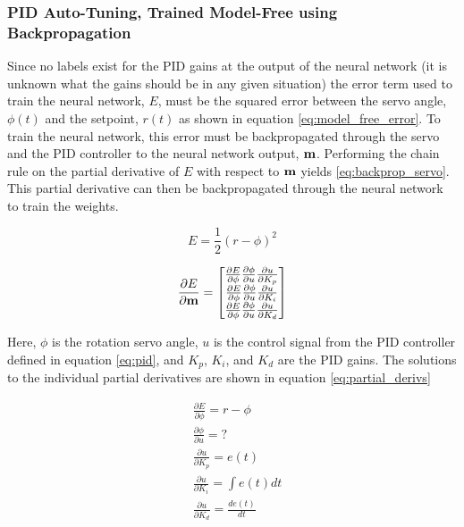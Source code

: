 \documentclass[letterpaper,12pt]{article}
\newcommand{\di}{\partial}
\begin{document}
\subsubsection{PID Auto-Tuning, Trained Model-Free using Backpropagation}\label{sec:model_free_backprop}
Since no labels exist for the PID gains at the output of the neural network (it is unknown what the gains should be in any given situation) the error term used to train the neural network, $E$, must be the squared error between the servo angle, $\phi(t)$ and the setpoint, $r(t)$ as shown in equation \ref{eq:model_free_error}. To train the neural network, this error must be backpropagated through the servo and the PID controller to the neural network output, $\bf{m}$. Performing the chain rule on the partial derivative of $E$ with respect to $\bf{m}$ yields \ref{eq:backprop_servo}. This partial derivative can then be backpropagated through the neural network to train the weights.

\begin{equation}
	\label{eq:model_free_error}
	E = \frac{1}{2}(r - \phi)^2
\end{equation}

\begin{equation}
	\label{eq:backprop_servo}
	\frac{\di E}{\di \bf{m}} =
	\begin{bmatrix}
		\frac{\di E}{\di \phi} \frac{\di \phi}{\di u} \frac{\di u}{\di K_p} \\
		\frac{\di E}{\di\phi} \frac{\di \phi}{\di u} \frac{\di u}{\di K_i} \\
		\frac{\di E}{\di \phi} \frac{\di \phi}{\di u} \frac{\di u}{\di K_d}
	\end{bmatrix}
\end{equation}

Here, $\phi$ is the rotation servo angle, $u$ is the control signal from the PID controller defined in equation \ref{eq:pid}, and $K_p$, $K_i$, and $K_d$ are the PID gains. The solutions to the individual partial derivatives are shown in equation \ref{eq:partial_derivs}

\begin{equation}
\begin{split}
	\label{eq:partial_derivs}
	& \frac{\di E}{\di \phi} = r - \phi \\
	& \frac{\di \phi}{\di u} = ? \\
	& \frac{\di u}{\di K_p} = e(t) \\
	& \frac{\di u}{\di K_i} = \int e(t)dt \\
	& \frac{\di u}{\di K_d} = \frac{de(t)}{dt} \\
\end{split}
\end{equation}
\end{document}
